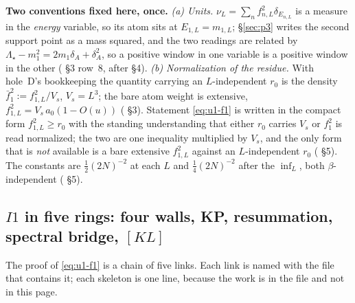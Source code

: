 \noindent\textbf{Two conventions fixed here, once.} \emph{(a) Units.} $\nu_L=\sum_nf_{n,L}^2
\delta_{E_{n,L}}$ is a measure in the \emph{energy} variable, so its atom sits at
$E_{1,L}=m_{1,L}$; \S\ref{sec:p3} writes the second support point as a mass squared, and the two
readings are related by $\Lambda_\star-m_1^2=2m_1\delta_A+\delta_A^2$, so a positive window in
one variable is a positive window in the other ( \S3 row~8, after
 \S4). \emph{(b) Normalization of the residue.} With hole~D's bookkeeping
the quantity carrying an $L$-independent $r_0$ is the density $\bar f_1^2:=f_{1,L}^2/V_s$,
$V_s=L^3$; the bare atom weight is extensive,
$f_{1,L}^2=V_s\,a_0(1-O(u))$ ( \S3). Statement \eqref{eq:u1-f1} is written in
the compact form $f_{1,L}^2\ge r_0$ with the standing understanding that either $r_0$ carries
$V_s$ or $f_1^2$ is read normalized; the two are one inequality multiplied by $V_s$, and the only
form that is \emph{not} available is a bare extensive $f_{1,L}^2$ against an $L$-independent
$r_0$ ( \S5). The constants are $\tfrac12(2N)^{-2}$ at each $L$ and
$\tfrac14(2N)^{-2}$ after the $\inf_L$, both $\beta$-independent ( \S5).

\subsection{$I1$ in five rings: four walls, KP, resummation, spectral bridge, $[KL]$}
\label{sec:u1-five-rings}

The proof of \eqref{eq:u1-f1} is a chain of five links. Each link is named with the file that
contains it; each skeleton is one line, because the work is in the file and not in this page.

